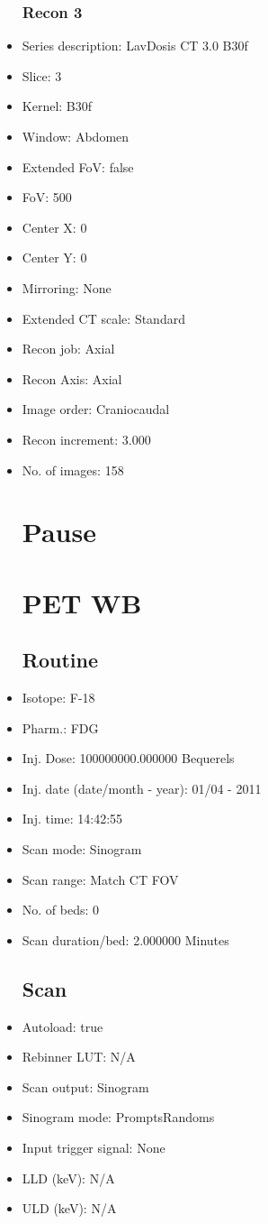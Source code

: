 \documentclass[12pt]{article}
\begin{document}
\begin{itemize}
\subsubsection{Recon 3}
\item Series description: LavDosis CT 3.0 B30f
\item Slice: 3
\item Kernel: B30f
\item Window: Abdomen
\item Extended FoV: false
\item FoV: 500
\item Center X: 0
\item Center Y: 0
\item Mirroring: None
\item Extended CT scale: Standard
\item Recon job: Axial
\item Recon Axis: Axial
\item Image order: Craniocaudal
\item Recon increment: 3.000
\item No. of images: 158
\section{Pause}
\section{PET WB}\subsection{Routine}
\item Isotope: F-18
\item Pharm.: FDG
\item Inj. Dose: 100000000.000000 Bequerels
\item Inj. date (date/month - year): 01/04 - 2011
\item Inj. time: 14:42:55
\item Scan mode: Sinogram
\item Scan range: Match CT FOV
\item No. of beds: 0
\item Scan duration/bed: 2.000000 Minutes
\subsection{Scan}
\item Autoload: true
\item Rebinner LUT: N/A
\item Scan output: Sinogram
\item Sinogram mode: PromptsRandoms
\item Input trigger signal: None
\item LLD (keV): N/A
\item ULD (keV): N/A

\end{itemize}
\end{document}
